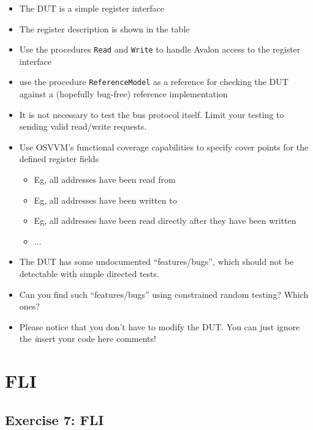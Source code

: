 \documentclass[12pt,epsf,makeidx,oneside]{book}
\begin{document}
  \begin{itemize}[noitemsep]
    \item The DUT is a simple register interface
    \item The register description is shown in the table
    \item Use the procedures {\tt Read} and {\tt Write} to handle Avalon access to the register interface
    \item use the procedure {\tt ReferenceModel} as a reference for checking the DUT against a (hopefully bug-free) reference implementation
    \item It is not necessary to test the bus protocol itself. Limit your testing to sending valid read/write requests.
    \item Use OSVVM's functional coverage capabilities to specify cover points for the defined register fields
    \begin{itemize}[noitemsep]
      \item Eg, all addresses have been read from
      \item Eg, all addresses have been written to
      \item Eg, all addresses have been read directly after they have been written
      \item ...
    \end{itemize}
    \item The DUT has some undocumented ``features/bugs'', which should not be detectable with simple directed tests.
    \item Can you find such ``features/bugs'' using constrained random testing? Which ones?
    \item Please notice that you don't have to modify the DUT. You can just ignore the {\emph insert your code here} comments!
  \end{itemize}

\chapter{FLI}
\section{Exercise 7: FLI}
\end{document}
